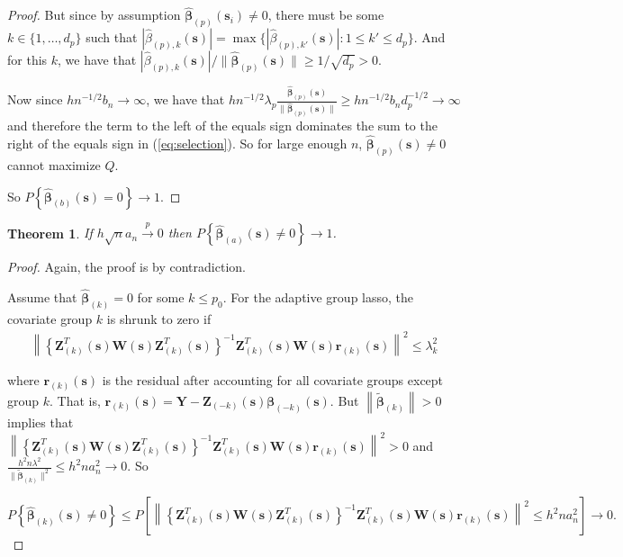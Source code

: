 \documentclass[authoryear, review, 11pt]{elsarticle}
\newtheorem{theorem}{Theorem}[section]
\begin{document}
\begin{proof}
        But since by assumption $\hat{\bm{\beta}}_{(p)} (\bm{s}_i) \ne 0$, there must be some $k \in \{ 1, \dots, d_p \}$ such that $ | \hat{\beta}_{(p),k} (\bm{s}) | = \max \{ | \hat{\beta}_{(p),k'} (\bm{s}) | : 1 \le k' \le d_p \} $. And for this $k$, we have that $| \hat{\beta}_{(p),k} (\bm{s}) | / \| \hat{\bm{\beta}}_{(p)} (\bm{s}) \| \ge 1 / \sqrt{d_p} > 0$.

        Now since $h n^{-1/2} b_n \to \infty$, we have that $h n^{-1/2} \lambda_p \frac{ \hat{\bm{\beta}}_{(p)} (\bm{s}) }{\| \hat{\bm{\beta}}_{(p)} (\bm{s}) \|} \ge h n^{-1/2} b_n d_p^{-1/2} \to \infty$ and therefore the term to the left of the equals sign dominates the sum to the right of the equals sign in (\ref{eq:selection}). So for large enough $n$, $\hat{\bm{\beta}}_{(p)} (\bm{s}) \ne 0$ cannot maximize $Q$.
        
        So $P \left\{ \hat{\bm{\beta}}_{(b)} (\bm{s}) = 0 \right\} \to 1$.
    \end{proof}


    \begin{theorem}\label{theorem:selection2}   
        If $h \sqrt{n} a_n \xrightarrow{p} 0$ then $P \left\{ \hat{\bm{\beta}}_{(a)} (\bm{s}) \ne 0 \right\} \to 1$.
    \end{theorem}

    \begin{proof}
        Again, the proof is by contradiction.

        Assume that $\hat{\bm{\beta}}_{(k)} = 0$ for some $k \le p_0$. For the adaptive group lasso, the covariate group $k$ is shrunk to zero if 
        \begin{align*}
            \left\| \left\{ \bm{Z}_{(k)}^T(\bm{s}) \bm{W}(\bm{s}) \bm{Z}_{(k)}^T(\bm{s})  \right\}^{-1} \bm{Z}_{(k)}^T(\bm{s}) \bm{W}(\bm{s}) \bm{r}_{(k)}(\bm{s}) \right\|^2 \le \lambda_k^2
        \end{align*}

        where $\bm{r}_{(k)}(\bm{s})$ is the residual after accounting for all covariate groups except group $k$. That is, $\bm{r}_{(k)}(\bm{s}) = \bm{Y} - \bm{Z}_{(-k)}(\bm{s}) \bm{\beta}_{(-k)}(\bm{s})$. But $\left\| \tilde{\bm{\beta}}_{(k)} \right\| > 0$ implies that $ \left\| \left\{ \bm{Z}_{(k)}^T(\bm{s}) \bm{W}(\bm{s}) \bm{Z}_{(k)}^T(\bm{s}) \right\}^{-1} \bm{Z}_{(k)}^T(\bm{s}) \bm{W}(\bm{s}) \bm{r}_{(k)}(\bm{s}) \right\|^2 > 0$ and $\frac{h^2 n \lambda^2}{ \| \tilde{\bm{\beta}}_{(k)} \|^2 }  \le h^2 n a_n^2 \to 0$. So

        \begin{equation}
            P \left\{ \hat{\bm{\beta}}_{(k)} (\bm{s}) \ne 0 \right\} \le P \left[ \left\| \left\{ \bm{Z}_{(k)}^T(\bm{s}) \bm{W}(\bm{s}) \bm{Z}_{(k)}^T(\bm{s}) \right\}^{-1} \bm{Z}_{(k)}^T(\bm{s}) \bm{W}(\bm{s}) \bm{r}_{(k)}(\bm{s}) \right\|^2 \le h^2 n a_n^2 \right] \to 0.
        \end{equation}
        
    \end{proof}
\end{document}
